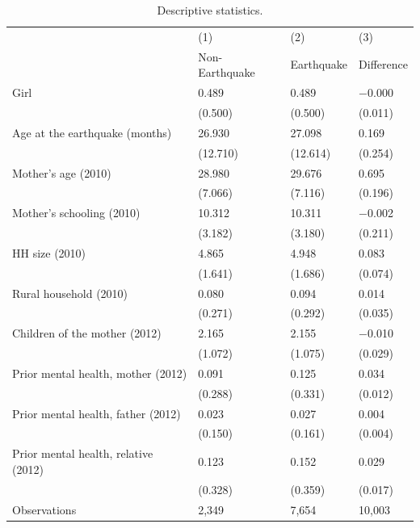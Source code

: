 \begin{table}[htbp]\centering
\begin{minipage}{360pt}
\caption{Descriptive statistics.}
\label{tab:sample}
{\small
\begin{tabular*}{360pt}{@{}l@{\extracolsep{\fill}}lll@{}}
\toprule
 & (1) & (2) & (3) \\
 & Non-Earthquake & Earthquake & Difference \\
\midrule
Girl & 0.489 & 0.489 & $-$0.000 \\
 & (0.500) & (0.500) & (0.011) \\
Age at the earthquake (months) & 26.930 & 27.098 & 0.169 \\
 & (12.710) & (12.614) & (0.254) \\
Mother's age (2010) & 28.980 & 29.676 & 0.695\sym{***} \\
 & (7.066) & (7.116) & (0.196) \\
Mother's schooling (2010) & 10.312 & 10.311 & $-$0.002 \\
 & (3.182) & (3.180) & (0.211) \\
HH size (2010) & 4.865 & 4.948 & 0.083 \\
 & (1.641) & (1.686) & (0.074) \\
Rural household (2010) & 0.080 & 0.094 & 0.014 \\
 & (0.271) & (0.292) & (0.035) \\
Children of the mother (2012) & 2.165 & 2.155 & $-$0.010 \\
 & (1.072) & (1.075) & (0.029) \\
Prior mental health, mother (2012) & 0.091 & 0.125 & 0.034\sym{***} \\
 & (0.288) & (0.331) & (0.012) \\
Prior mental health, father (2012) & 0.023 & 0.027 & 0.004 \\
 & (0.150) & (0.161) & (0.004) \\
Prior mental health, relative (2012) & 0.123 & 0.152 & 0.029\sym{*} \\
 & (0.328) & (0.359) & (0.017) \\
\addlinespace[6pt]
Observations & 2,349 & 7,654 & 10,003 \\
\bottomrule
\end{tabular*}\par}
\vspace{4pt}
{\footnotesize
}
\end{minipage}
\end{table}
